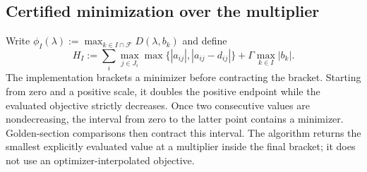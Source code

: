 \documentclass[11pt]{article}
\theoremstyle{plain}
\theoremstyle{definition}
\theoremstyle{remark}
\begin{document}
\subsection{Certified minimization over the multiplier}

Write $\phi_I(\lambda):=\max_{k\in I\cap\mathcal F}D(\lambda,b_k)$ and define
\begin{equation}\label{eq:lipschitz}
H_I:=\sum_i\max_{j\in J_i}\max\{|a_{ij}|,|a_{ij}-d_{ij}|\}
+\Gamma\max_{k\in I}|b_k|.
\end{equation}
The implementation brackets a minimizer before contracting the bracket.  Starting from zero and a positive scale, it doubles the positive endpoint while the evaluated objective strictly decreases.  Once two consecutive values are nondecreasing, the interval from zero to the latter point contains a minimizer.  Golden-section comparisons then contract this interval.  The algorithm returns the smallest explicitly evaluated value at a multiplier inside the final bracket; it does not use an optimizer-interpolated objective.
\end{document}
